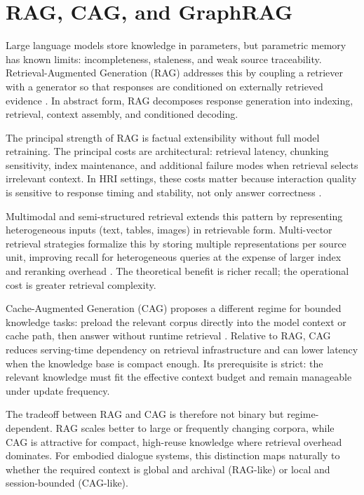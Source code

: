   \section{RAG, CAG, and GraphRAG}

  Large language models store knowledge in parameters, but parametric memory has known limits: incompleteness, staleness, and weak source traceability. Retrieval-Augmented Generation (RAG) addresses this
  by coupling a retriever with a generator so that responses are conditioned on externally retrieved evidence \cite{lewis_retrieval-augmented_2020}. In abstract form, RAG decomposes response generation
  into indexing, retrieval, context assembly, and conditioned decoding.

  The principal strength of RAG is factual extensibility without full model retraining. The principal costs are architectural: retrieval latency, chunking sensitivity, index maintenance, and additional
  failure modes when retrieval selects irrelevant context. In HRI settings, these costs matter because interaction quality is sensitive to response timing and stability, not only answer correctness
  \cite{fazlollahtabar_human-robot_2025}.

  Multimodal and semi-structured retrieval extends this pattern by representing heterogeneous inputs (text, tables, images) in retrievable form. Multi-vector retrieval strategies formalize this by
  storing multiple representations per source unit, improving recall for heterogeneous queries at the expense of larger index and reranking overhead \cite{noauthor_multi-vector_nodate}. The theoretical
  benefit is richer recall; the operational cost is greater retrieval complexity.

  Cache-Augmented Generation (CAG) proposes a different regime for bounded knowledge tasks: preload the relevant corpus directly into the model context or cache path, then answer without runtime
  retrieval \cite{Chan_2025}. Relative to RAG, CAG reduces serving-time dependency on retrieval infrastructure and can lower latency when the knowledge base is compact enough. Its prerequisite is strict:
  the relevant knowledge must fit the effective context budget and remain manageable under update frequency.

  The tradeoff between RAG and CAG is therefore not binary but regime-dependent. RAG scales better to large or frequently changing corpora, while CAG is attractive for compact, high-reuse knowledge where
  retrieval overhead dominates. For embodied dialogue systems, this distinction maps naturally to whether the required context is global and archival (RAG-like) or local and session-bounded (CAG-like).

